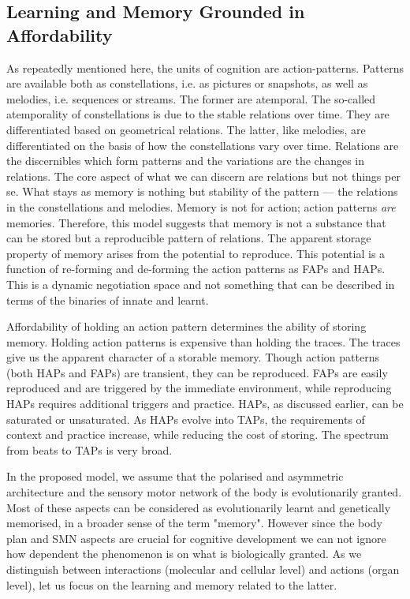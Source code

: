 \subsection{Learning and Memory Grounded in Affordability}
As repeatedly mentioned here, the units of cognition are action-patterns. Patterns are available both as constellations, i.e. as pictures or snapshots, as well as melodies, i.e. sequences or streams. The former are atemporal. The so-called atemporality of constellations is due to the stable relations over time. They are differentiated based on geometrical relations. The latter, like melodies, are differentiated on the basis of how the constellations vary over time. Relations are the discernibles which form patterns and the variations are the changes in relations. The core aspect of what we can discern are relations but not things per se. What stays as memory is nothing but stability of the pattern --- the relations in the constellations and melodies. Memory is not for action; action patterns \textit{are} memories. Therefore, this model suggests that memory is not a substance that can be stored but a reproducible pattern of relations. The apparent storage property of memory arises from the potential to reproduce.
This potential is a function of re-forming and de-forming the action patterns as FAPs and HAPs. This is a dynamic negotiation space and not something that can be described in terms of the binaries of innate and learnt. 

Affordability of holding an action pattern determines the ability of storing memory. Holding action patterns is expensive than holding the traces. The traces give us the apparent character of a storable memory. Though action patterns (both HAPs and FAPs) are transient, they can be reproduced. FAPs are easily reproduced and are triggered by the immediate environment, while reproducing HAPs requires additional triggers and practice. HAPs, as discussed earlier, can be saturated or unsaturated. As HAPs evolve into TAPs, the requirements of context and practice increase, while reducing the cost of storing. The spectrum from beats to TAPs is very broad. 

In the proposed model, we assume that the polarised and asymmetric architecture and the sensory motor network of the body is evolutionarily granted. Most of these aspects can be considered as evolutionarily learnt and genetically memorised, in a broader sense of the term "memory". However since the body plan and SMN aspects are crucial for cognitive development we can not ignore how dependent the phenomenon is on what is biologically granted. As we distinguish between interactions (molecular and cellular level) and actions (organ level), let us focus on the learning and memory related to the latter. 

